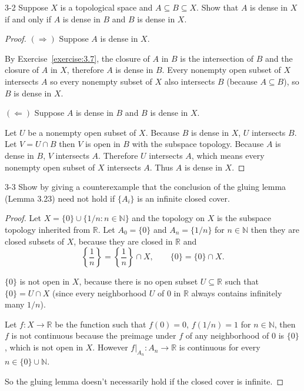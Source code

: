 \begin{problem}{3-2}
Suppose $X$ is a topological space and $A\subseteq B\subseteq X$. Show that $A$ is dense in $X$ if and only if $A$ is dense in $B$ and $B$ is dense in $X$.
\end{problem}

\begin{proof}
    $(\Longrightarrow)$ Suppose $A$ is dense in $X$.

    By Exercise~\ref{exercise:3.7}, the closure of $A$ in $B$ is the intersection of $B$ and the closure of $A$ in $X$, therefore $A$ is dense in $B$. Every nonempty open subset of $X$ intersects $A$ so every nonempty subset of $X$ also intersects $B$ (because $A\subseteq B$), so $B$ is dense in $X$.

    $(\Longleftarrow)$ Suppose $A$ is dense in $B$ and $B$ is dense in $X$.

    Let $U$ be a nonempty open subset of $X$. Because $B$ is dense in $X$, $U$ intersects $B$. Let $V = U\cap B$ then $V$ is open in $B$ with the subspace topology. Because $A$ is dense in $B$, $V$ intersects $A$. Therefore $U$ intersects $A$, which means every nonempty open subset of $X$ intersects $A$. Thus $A$ is dense in $X$.
\end{proof}

\begin{problem}{3-3}
Show by giving a counterexample that the conclusion of the gluing lemma (Lemma 3.23) need not hold if $\{ A_{i} \}$ is an infinite closed cover.
\end{problem}

\begin{proof}
    Let $X = \{ 0 \} \cup \{ 1/n : n\in\mathbb{N} \}$ and the topology on $X$ is the subspace topology inherited from $\mathbb{R}$. Let $A_{0} = \{ 0 \}$ and $A_{n} = \{ 1/n \}$ for $n\in\mathbb{N}$ then they are closed subsets of $X$, because they are closed in $\mathbb{R}$ and
    \[
        \left\{ \frac{1}{n} \right\} = \left\{\frac{1}{n}\right\} \cap X,\qquad \{ 0 \} = \{ 0 \} \cap X.
    \]

    $\{ 0 \}$ is not open in $X$, because there is no open subset $U\subseteq\mathbb{R}$ such that $\{ 0 \} = U\cap X$ (since every neighborhood $U$ of $0$ in $\mathbb{R}$ always contains infinitely many $1/n$).

    Let $f: X\to \mathbb{R}$ be the function such that $f(0) = 0$, $f(1/n) = 1$ for $n\in\mathbb{N}$, then $f$ is not continuous because the preimage under $f$ of any neighborhood of $0$ is $\{ 0 \}$, which is not open in $X$. However $f\vert_{A_{n}}: A_{n}\to \mathbb{R}$ is continuous for every $n\in \{ 0 \}\cup\mathbb{N}$.

    So the gluing lemma doesn't necessarily hold if the closed cover is infinite.
\end{proof}

